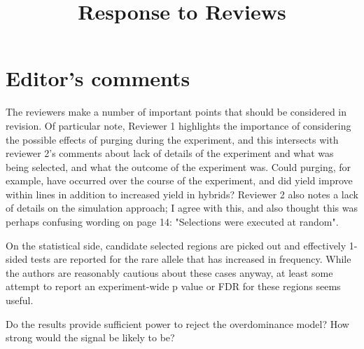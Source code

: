 \documentclass[onecolumn,oneside,letterpaper]{article}
\title{Response to Reviews}
\begin{document}
\maketitle


\section*{Editor's comments}

The reviewers make a number of important points that should be considered in revision. Of particular note, Reviewer 1 highlights the importance of considering the possible effects of purging during the experiment, and this intersects with reviewer 2's comments about lack of details of the experiment and what was being selected, and what the outcome of the experiment was. Could purging, for example, have occurred over the course of the experiment, and did yield improve within lines in addition to increased yield in hybrids? Reviewer 2 also notes a lack of details on the simulation approach; I agree with this, and also thought this was perhaps confusing wording on page 14: "Selections were executed at random".


On the statistical side, candidate selected regions are picked out and effectively 1-sided tests are reported for the rare allele that has increased in frequency. While the authors are reasonably cautious about these cases anyway, at least some attempt to report an experiment-wide p value or FDR for these regions seems useful.


Do the results provide sufficient power to reject the overdominance model? How strong would the signal be likely to be?

\end{document}
